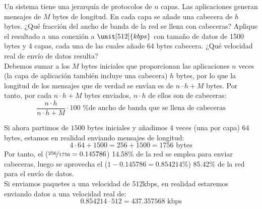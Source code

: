 \begin{ejercicio}
 Un sistema tiene una jerarquía de protocolos de $n$ capas. Las aplicaciones generan mensajes de $M$ bytes de longitud. En cada capa se añade una cabecera de $h$ bytes. ¿Qué fracción del ancho de banda de la red se llena con cabeceras? Aplique el resultado a una conexión a $\unit[512]{kbps}$ con tamaño de datos de 1500 bytes y 4 capas, cada una de las cuales añade 64 bytes cabecera. ¿Qué velocidad real de envío de datos resulta?\\

 Debemos sumar a los $M$ bytes iniciales que proporcionan las aplicaciones $n$ veces (la capa de aplicación también incluye una cabecera) $h$ bytes, por lo que la longitud de los mensajes que de verdad se envían es de $n\cdot h + M$ bytes. Por tanto, por cada $n\cdot h + M$ bytes enviados, $n\cdot h$ de ellos son de cabeceras:
 \begin{equation*}
     \dfrac{n\cdot h}{n\cdot h + M}\cdot 100 \text{\ \ \% de ancho de banda que se llena de cabeceras}
 \end{equation*}

 Si ahora partimos de $1500$ bytes iniciales y añadimos 4 veces (una por capa) $64$ bytes, estamos en realidad enviando mensajes de longitud:
 \begin{equation*}
     4\cdot 64 + 1500 = 256 + 1500 = 1756 \text{\ bytes}
 \end{equation*}
 Por tanto, el ($\nicefrac{256}{1756} = 0.145786$) 14.58\% de la red se emplea para enviar cabeceras, luego se aprovecha el ($1-0.145786 = 0.854214\%$) 85.42\% de la red para el envío de datos.\\

 Si enviamos paquetes a una velocidad de 512kbps, en realidad estaremos enviando datos a una velocidad real de:
 \begin{equation*}
     0.854214 \cdot 512 = 437.357568 \text{\ kbps}
 \end{equation*}
\end{ejercicio}


